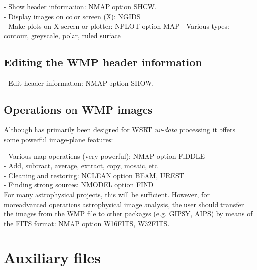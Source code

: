 - Show header information: NMAP option SHOW.\\ 
- Display images on color screen (X): NGIDS\\ 
- Make plots on X-screen or plotter: NPLOT option MAP 
\hspace*{5mm} - Various types: contour, greyscale, polar, ruled surface\\ 

\subsection{Editing the WMP header information} 
\label{wmp.edit} 

- Edit header information: NMAP option SHOW.\\ 

\subsection{Operations on WMP images} 
\label{wmp.oper} 

	Although \NEWSTAR has primarily been designed for WSRT {\em uv-data}
processing it offers some powerful image-plane features: 

- Various map operations (very powerful): NMAP option FIDDLE\\ 
\hspace*{5mm} - Add, subtract, average, extract, copy, mosaic, etc\\ 
- Cleaning and restoring: NCLEAN option BEAM, UREST\\ 
- Finding strong sources: NMODEL option FIND\\ 

	For many astrophysical projects, this will be sufficient. 
However, for moreadvanced operations astrophysical image analysis, the user
should transfer the images from the WMP file to other packages 
(e.g.  GIPSY, AIPS) by means of the FITS format: NMAP option W16FITS, 
W32FITS.


\section{Auxiliary \NEWSTAR files} 

